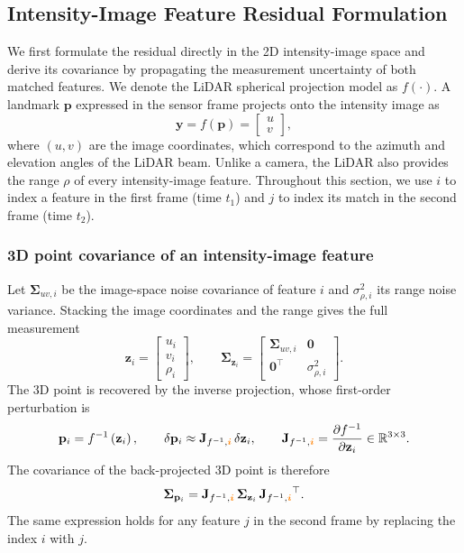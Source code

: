\subsection{Intensity-Image Feature Residual Formulation}
\label{sec:feat_res_2d}
We first formulate the residual directly in the 2D intensity-image space and derive its covariance by propagating the measurement uncertainty of both matched features. We denote the LiDAR spherical projection model as $f(\cdot)$. A landmark $\mathbf{p}$ expressed in the sensor frame projects onto the intensity image as
\begin{equation}
    \mathbf{y} = f\left(\mathbf{p}\right) = \begin{bmatrix} u \\ v \end{bmatrix},
\end{equation}
where $(u, v)$ are the image coordinates, which correspond to the azimuth and elevation angles of the LiDAR beam. Unlike a camera, the LiDAR also provides the range $\rho$ of every intensity-image feature. Throughout this section, we use $i$ to index a feature in the first frame (time $t_1$) and $j$ to index its match in the second frame (time $t_2$).

\subsubsection{3D point covariance of an intensity-image feature}
\label{sec:feat_point_cov}
Let $\bm{\Sigma}_{uv,i}$ be the image-space noise covariance of feature $i$ and $\sigma_{\rho,i}^2$ its range noise variance. Stacking the image coordinates and the range gives the full measurement
\begin{equation}
    \mathbf{z}_i = \begin{bmatrix} u_i \\ v_i \\ \rho_i \end{bmatrix}, \qquad
    \bm{\Sigma}_{\mathbf{z}_i} = \begin{bmatrix} \bm{\Sigma}_{uv,i} & \mathbf{0} \\ \mathbf{0}^{\top} & \sigma_{\rho,i}^2 \end{bmatrix}.
\end{equation}
The 3D point is recovered by the inverse projection, whose first-order perturbation is
\begin{equation}
    \mathbf{p}_i = f^{-1}\left(\mathbf{z}_i\right), \qquad
    \delta\mathbf{p}_i \approx \mathbf{J}_{f^{-1},\color{orange}{\bm{i}}}\,\delta\mathbf{z}_i, \qquad
    \mathbf{J}_{f^{-1},\color{orange}{\bm{i}}} = \frac{\partial f^{-1}}{\partial \mathbf{z}_i} \in \mathbb{R}^{3\times 3}.
\end{equation}
The covariance of the back-projected 3D point is therefore
\begin{equation}
    \label{eq:point_cov}
    \bm{\Sigma}_{\mathbf{p}_i} = \mathbf{J}_{f^{-1},\color{orange}{\bm{i}}}\,\bm{\Sigma}_{\mathbf{z}_i}\,\mathbf{J}_{f^{-1},\color{orange}{\bm{i}}}^{\top}.
\end{equation}
The same expression holds for any feature $j$ in the second frame by replacing the index $i$ with $j$.

